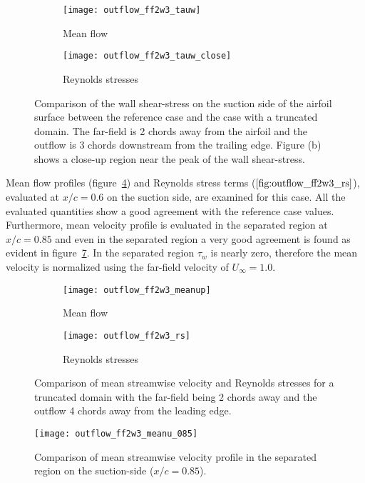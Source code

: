 \begin{figure}
	\centering
	\begin{subfigure}[h]{0.45\textwidth}
		\centering
		\texttt{[image: outflow\_ff2w3\_tauw]}
		\caption{Mean flow}
		\label{fig:outflow_ff2w3_ws}
	\end{subfigure}
	\begin{subfigure}[h]{0.45\textwidth}
		\centering
		\texttt{[image: outflow\_ff2w3\_tauw\_close]}
		\caption{Reynolds stresses}
		\label{fig:outflow_ff2w3_ws_close}
	\end{subfigure}
	\caption{Comparison of the wall shear-stress on the suction side of the airfoil surface between the reference case and the case with a truncated domain. The far-field is 2 chords away from the airfoil and the outflow is 3 chords downstream from the trailing edge. Figure (b) shows a close-up region near the peak of the wall shear-stress.}
	\label{fig:outflow_ff2w3}
\end{figure}
Mean flow profiles (figure~\ref{fig:outflow_ff2w3_up}) and Reynolds stress terms ($\ref{fig:outflow_ff2w3_rs}$), evaluated at $x/c=0.6$ on the suction side, are examined for this case. All the evaluated quantities show a good agreement with the reference case values. Furthermore, mean velocity profile is evaluated in the separated region at $x/c=0.85$ and even in the separated region a very good agreement is found as evident in figure~\ref{fig:outflow_ff2w3_meanu_sep}. In the separated region $\tau_{w}$ is nearly zero, therefore the mean velocity is normalized using the far-field velocity of $U_{\infty}=1.0$.
\begin{figure}
	\centering
	\begin{subfigure}[h]{0.45\textwidth}
		\centering
		\texttt{[image: outflow\_ff2w3\_meanup]}
		\caption{Mean flow}
		\label{fig:outflow_ff2w3_up}
	\end{subfigure}
	\begin{subfigure}[h]{0.45\textwidth}
		\centering
		\texttt{[image: outflow\_ff2w3\_rs]}
		\caption{Reynolds stresses}
		\label{fig:outflow_ff2w3_rs}
	\end{subfigure}
	\caption{Comparison of mean streamwise velocity and Reynolds stresses for a truncated domain with the far-field being 2 chords away and the outflow 4 chords away from the leading edge.}
	\label{fig:outflow_ff2w3_u_rs}
\end{figure}
\begin{figure}
	\centering
	\texttt{[image: outflow\_ff2w3\_meanu\_085]}
	\caption{Comparison of mean streamwise velocity profile in the separated region on the suction-side ($x/c=0.85$).}
	\label{fig:outflow_ff2w3_meanu_sep}
\end{figure}
